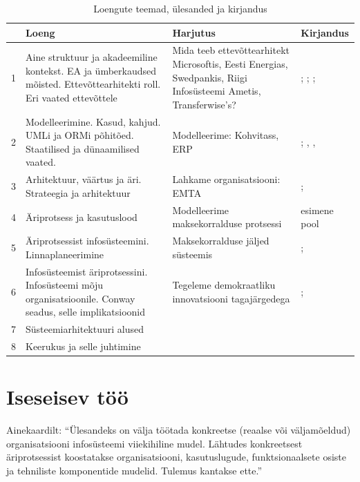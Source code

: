 \documentclass[nobib]{tufte-handout}
\begin{document}
\renewcommand{\arraystretch}{1.3}
\begin{table}[ht]
\small
	\centering
	\selectfont
	\begin{tabular}{lp{5cm}p{6cm}p{4cm}}
		\toprule
		& Loeng & Harjutus & Kirjandus\\
		\midrule
		1 & Aine struktuur ja akadeemiline kontekst. EA ja ümberkaudsed mõisted. Ettevõttearhitekti roll. Eri vaated ettevõttele & Mida teeb ettevõttearhitekt Microsoftis, Eesti Energias, Swedpankis, Riigi Infosüsteemi Ametis, Transferwise's?  & \cite{parsons2005enterprise}; \cite{hickey}; \cite{sysengineering}; \cite{winter2006essential}\\
		2 & Modelleerimine. Kasud, kahjud. UMLi ja ORMi põhitõed. Staatilised ja dünaamilised vaated. & Modelleerime: Kohvitass, ERP & \cite{OPM}; \cite{heumann2005introduction}, \cite{box1976science}, \cite[peatükk 3]{ferenvcik2004survey}\\
		3 & Arhitektuur, väärtus ja äri. Strateegia ja arhitektuur & Lahkame organisatsiooni: EMTA & \cite{gadiesh2001transforming}; \cite{senge2002leader}\\
		4 & Äriprotsess ja kasutuslood & Modelleerime maksekorralduse protsessi & \cite{checkland2000soft} esimene pool \\
		5 & Äriprotsessist infosüsteemini. Linnaplaneerimine & Maksekorralduse jäljed süsteemis & \cite{wohed2006suitability}; \cite{bertin2014urbanization}\\
		6 & Infosüsteemist äriprotsessini. Infosüsteemi mõju organisatsioonile. Conway seadus, selle implikatsioonid & Tegeleme demokraatliku innovatsiooni tagajärgedega & \cite{conway1968committees}; \cite{maccormack2012exploring}\\
		7 & Süsteemiarhitektuuri alused & & \cite{crawley2015system}\\
		8 & Keerukus ja selle juhtimine & & \cite{holt2017so}\\
		\bottomrule
	\end{tabular}
	\caption{Loengute teemad, ülesanded ja kirjandus}
	\label{tab:content}
\end{table}

\section{Iseseisev töö}
Ainekaardilt: \enquote{Ülesandeks on välja töötada konkreetse (reaalse või väljamõeldud) organisatsiooni infosüsteemi viiekihiline mudel. Lähtudes konkreetsest äriprotsessist koostatakse organisatsiooni, kasutuslugude, funktsionaalsete osiste ja tehniliste komponentide mudelid. Tulemus kantakse ette.}
\end{document}
